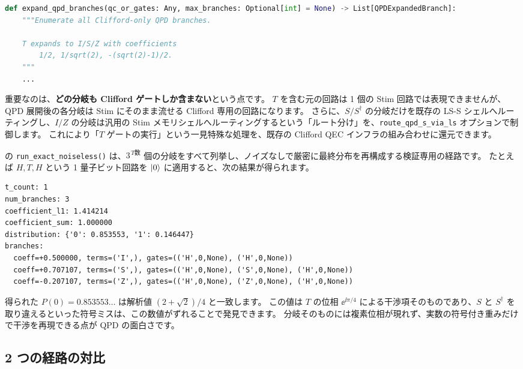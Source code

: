 \begin{lstlisting}[language=Python, caption={QPD 分岐の展開（src/stages/01\_mpp/src/ftqc/qpd\_backend.py）}]
def expand_qpd_branches(qc_or_gates: Any, max_branches: Optional[int] = None) -> List[QPDExpandedBranch]:
    """Enumerate all Clifford-only QPD branches.

    T expands to I/S/Z with coefficients
        1/2, 1/sqrt(2), -(sqrt(2)-1)/2.
    """
    ...
\end{lstlisting}

重要なのは、\textbf{どの分岐も Clifford ゲートしか含まない}という点です。
$T$ を含む元の回路は 1 個の Stim 回路では表現できませんが、QPD 展開後の各分岐は Stim にそのまま流せる Clifford 専用の回路になります。
さらに、$S/S^\dagger$ の分岐だけを既存の LS-S シェルへルーティングし、$I/Z$ の分岐は汎用の Stim メモリシェルへルーティングするという「ルート分け」を、\texttt{route\_qpd\_s\_via\_ls} オプションで制御します。
これにより「$T$ ゲートの実行」という一見特殊な処理を、既存の Clifford QEC インフラの組み合わせに還元できます。

 の \texttt{run\_exact\_noiseless()} は、$3^{\,T\text{数}}$ 個の分岐をすべて列挙し、ノイズなしで厳密に最終分布を再構成する検証専用の経路です。
たとえば $H,T,H$ という 1 量子ビット回路を $\ket0$ に適用すると、次の結果が得られます。

\begin{lstlisting}[caption={qpd\_backend.py の run\_exact\_noiseless() 実行結果（H T H, 入力 |0>）}]
t_count: 1
num_branches: 3
coefficient_l1: 1.414214
coefficient_sum: 1.000000
distribution: {'0': 0.853553, '1': 0.146447}
branches:
  coeff=+0.500000, terms=('I',), gates=(('H',0,None), ('H',0,None))
  coeff=+0.707107, terms=('S',), gates=(('H',0,None), ('S',0,None), ('H',0,None))
  coeff=-0.207107, terms=('Z',), gates=(('H',0,None), ('Z',0,None), ('H',0,None))
\end{lstlisting}

得られた $P(0)=0.853553\ldots$ は解析値 $(2+\sqrt2)/4$ と一致します。
この値は $T$ の位相 $\ee^{\ii\pi/4}$ による干渉項そのものであり、$S$ と $S^\dagger$ を取り違えるといった符号ミスは、この数値がずれることで発見できます。
分岐そのものには複素位相が現れず、実数の符号付き重みだけで干渉を再現できる点が QPD の面白さです。

\subsection{2 つの経路の対比}

